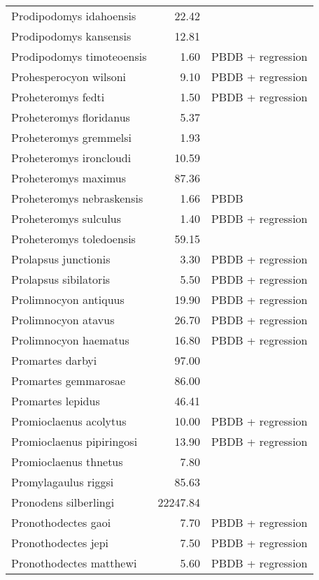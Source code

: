 \begin{table}[ht]
\begin{tabular}{lrl}
  Prodipodomys idahoensis & 22.42 & \cite{Tomiya2013} \\ 
  Prodipodomys kansensis & 12.81 & \cite{Tomiya2013} \\ 
  Prodipodomys timoteoensis & 1.60 & PBDB + regression \\ 
  Prohesperocyon wilsoni & 9.10 & PBDB + regression \\ 
  Proheteromys fedti & 1.50 & PBDB + regression \\ 
  Proheteromys floridanus & 5.37 & \cite{Tomiya2013} \\ 
  Proheteromys gremmelsi & 1.93 & \cite{Becker1981} \\ 
  Proheteromys ironcloudi & 10.59 & \cite{Tomiya2013} \\ 
  Proheteromys maximus & 87.36 & \cite{Tomiya2013} \\ 
  Proheteromys nebraskensis & 1.66 & PBDB \\ 
  Proheteromys sulculus & 1.40 & PBDB + regression \\ 
  Proheteromys toledoensis & 59.15 & \cite{Tomiya2013} \\ 
  Prolapsus junctionis & 3.30 & PBDB + regression \\ 
  Prolapsus sibilatoris & 5.50 & PBDB + regression \\ 
  Prolimnocyon antiquus & 19.90 & PBDB + regression \\ 
  Prolimnocyon atavus & 26.70 & PBDB + regression \\ 
  Prolimnocyon haematus & 16.80 & PBDB + regression \\ 
  Promartes darbyi & 97.00 & \cite{Dawson2007} \\ 
  Promartes gemmarosae & 86.00 & \cite{Dawson2007} \\ 
  Promartes lepidus & 46.41 & \cite{Mora2005} \\ 
  Promioclaenus acolytus & 10.00 & PBDB + regression \\ 
  Promioclaenus pipiringosi & 13.90 & PBDB + regression \\ 
  Promioclaenus thnetus & 7.80 & \cite{Gazin1930} \\ 
  Promylagaulus riggsi & 85.63 & \cite{Tomiya2013} \\ 
  Pronodens silberlingi & 22247.84 & \cite{Tomiya2013} \\ 
  Pronothodectes gaoi & 7.70 & PBDB + regression \\ 
  Pronothodectes jepi & 7.50 & PBDB + regression \\ 
  Pronothodectes matthewi & 5.60 & PBDB + regression \\ 

\end{tabular}
\end{table}
